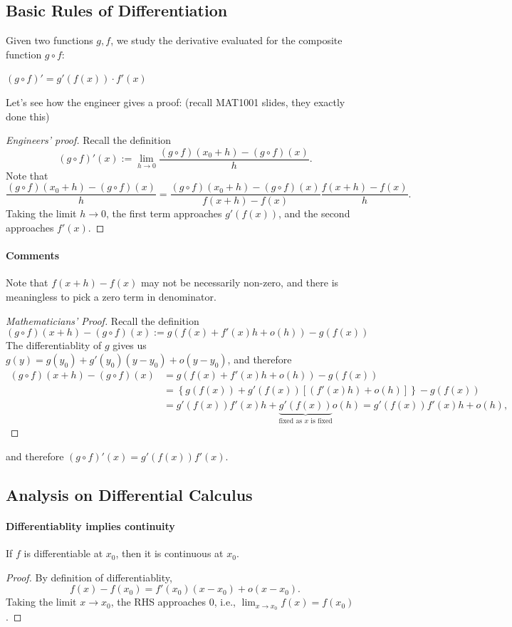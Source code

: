 \subsection{Basic Rules of Differentiation}
Given two functions $g,f$, we study the derivative evaluated for the composite function $g\circ f$:
\begin{proposition}
$(g\circ f)'=g'(f(x))\cdot f'(x)$
\end{proposition}

Let's see how the engineer gives a proof: (recall MAT1001 slides, they exactly done this)
\begin{proof}[Engineers' proof]
Recall the definition
\[
(g\circ f)'(x):=\lim_{h\to0}\frac{(g\circ f)(x_0+h) - (g\circ f)(x)}{h}.
\]
Note that 
\[
\frac{(g\circ f)(x_0+h) - (g\circ f)(x)}{h}
=
\frac{(g\circ f)(x_0+h) - (g\circ f)(x)}{f(x+h) - f(x)}\frac{f(x+h) - f(x)}{h}.
\]
Taking the limit $h\to0$, the first term approaches $g'(f(x))$, and the second approaches $f'(x)$.
\end{proof}
\paragraph{Comments}
Note that $f(x+h) - f(x)$ may not be necessarily non-zero, and there is meaningless to pick a zero term in denominator.
\begin{proof}[Mathematicians' Proof]
Recall the definition
\[
(g\circ f)(x+h) - (g\circ f)(x)
:=
g(f(x)+f'(x)h+o(h)) - g(f(x))
\]
The differentiablity of $g$ gives us $g(y) = g(y_0) + g'(y_0)(y-y_0)+o(y-y_0)$, and therefore
\begin{align*}
(g\circ f)(x+h) - (g\circ f)(x)
&=
g(f(x)+f'(x)h+o(h)) - g(f(x))\\
&=\left\{g(f(x)) + g'(f(x))\left[(f'(x)h)+o(h)\right]\right\}-g(f(x))\\
&=g'(f(x))f'(x)h+\underbrace{g'(f(x))}_{\text{fixed as $x$ is fixed}}o(h)=g'(f(x))f'(x)h+o(h),
\end{align*}
\end{proof}
and therefore $(g\circ f)'(x)=g'(f(x))f'(x)$.

\subsection{Analysis on Differential Calculus}
\paragraph{Differentiablity implies continuity}
\begin{proposition}
If $f$ is differentiable at $x_0$, then it is continuous at $x_0$.
\end{proposition}
\begin{proof}
By definition of differentiablity,
\[
f(x)-f(x_0)=f'(x_0)(x-x_0)+o(x-x_0).
\]
Taking the limit $x\to x_0$, the RHS approaches 0, i.e., $\lim_{x\to x_0}f(x)=f(x_0)$.
\end{proof}


